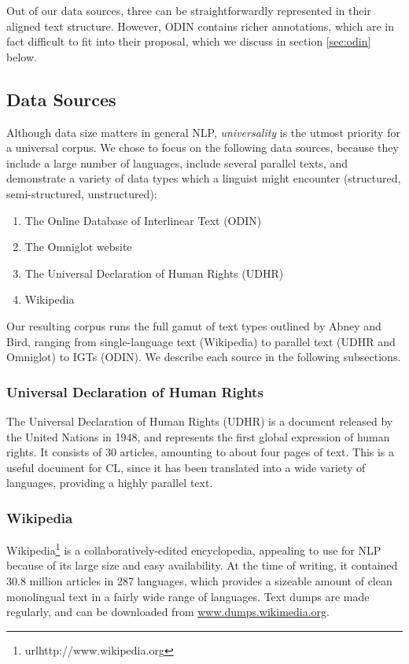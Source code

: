 Out of our data sources, three can be straightforwardly represented in their aligned text structure.  However, ODIN contains richer annotations, which are in fact difficult to fit into their proposal, which we discuss in section \ref{sec:odin} below.


\subsection{Data Sources} \label{sec:sources}

Although data size matters in general NLP, \emph{universality} is the utmost priority for a universal corpus. We chose to focus on the following data sources, because they include a large number of languages, include several parallel texts, and demonstrate a variety of data types which a linguist might encounter (structured, semi-structured, unstructured):

\begin{enumerate}
\item The Online Database of Interlinear Text (ODIN)
\item The Omniglot website
\item The Universal Declaration of Human Rights (UDHR)
\item Wikipedia
\end{enumerate}


Our resulting corpus runs the full gamut of text types outlined by Abney and Bird, ranging from single-language text (Wikipedia) to parallel text (UDHR and Omniglot) to IGTs (ODIN).  We describe each source in the following subsections.


\subsubsection{Universal Declaration of Human Rights}

The Universal Declaration of Human Rights (UDHR) is a document released by the United Nations in 1948, and represents the first global expression of human rights. It consists of 30 articles, amounting to about four pages of text. This is a useful document for CL, since it has been translated into a wide variety of languages, providing a highly parallel text.


\subsubsection{Wikipedia}

Wikipedia\footnote{url{http://www.wikipedia.org}} is a collaboratively-edited encyclopedia, appealing to use for NLP because of its large size and easy availability. At the time of writing, it contained 30.8 million articles in 287 languages, which provides a sizeable amount of clean monolingual text in a fairly wide range of languages. Text dumps are made regularly, and can be downloaded from \url{www.dumps.wikimedia.org}.

